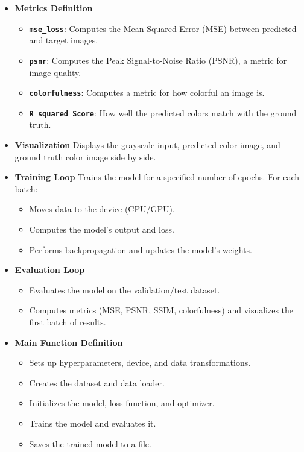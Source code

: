 \documentclass[conference]{IEEEtran}
\begin{document}
\begin{itemize}
\item \textbf{Metrics Definition}
\begin{itemize}
    \item \textbf{\lstinline|mse_loss|}: Computes the Mean Squared Error (MSE) between predicted and target images.
    \item \textbf{\lstinline|psnr|}: Computes the Peak Signal-to-Noise Ratio (PSNR), a metric for image quality.
    \item \textbf{\lstinline|colorfulness|}: Computes a metric for how colorful an image is.
    \item \textbf{\lstinline|R squared Score|}: How well the predicted colors match with the ground truth.
\end{itemize}

\item \textbf{Visualization}
Displays the grayscale input, predicted color image, and ground truth color image side by side.

\item \textbf{Training Loop}
Trains the model for a specified number of epochs.
For each batch:
    \begin{itemize}
        \item Moves data to the device (CPU/GPU).
    \end{itemize}
    \begin{itemize}
        \item Computes the model’s output and loss.
    \end{itemize}
    \begin{itemize}
        \item Performs backpropagation and updates the model’s weights.
    \end{itemize}

\item \textbf{Evaluation Loop}
\begin{itemize}
    \item Evaluates the model on the validation/test dataset.
    \item Computes metrics (MSE, PSNR, SSIM, colorfulness) and visualizes the first batch of results.
\end{itemize}

\item \textbf{Main Function Definition}
\begin{itemize}
    \item Sets up hyperparameters, device, and data transformations.
    \item Creates the dataset and data loader.
    \item Initializes the model, loss function, and optimizer.
    \item Trains the model and evaluates it.
    \item Saves the trained model to a file.
\end{itemize}


\end{itemize}
\end{document}
